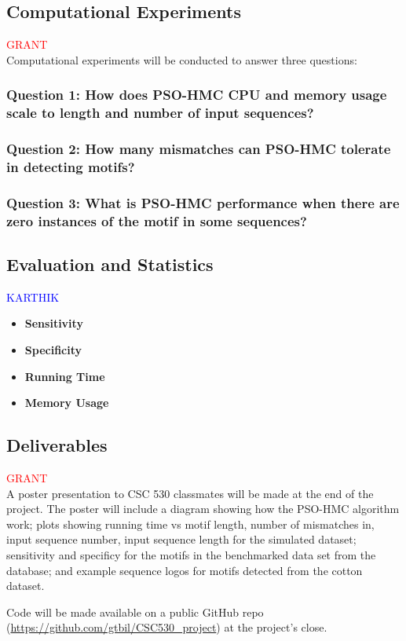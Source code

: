 \documentclass{article}
\begin{document}
\subsection{Computational Experiments}
\textcolor{red}{GRANT} \\
Computational experiments will be conducted to answer three questions:
\subsubsection{Question 1: How does PSO-HMC CPU and memory usage scale to length and number of input sequences?}
\subsubsection{Question 2: How many mismatches can PSO-HMC tolerate in detecting motifs?}
\subsubsection{Question 3: What is PSO-HMC performance when there are zero instances of the motif in some sequences?}
\subsection{Evaluation and Statistics}
\textcolor{blue}{KARTHIK} \\
\begin{itemize}
	\item \textbf{Sensitivity}
	\item \textbf{Specificity}
	\item \textbf{Running Time}
	\item \textbf{Memory Usage}
\end{itemize}
\subsection{Deliverables}
\textcolor{red}{GRANT} \\
A poster presentation to CSC 530 classmates will be made at the end of the project. The poster will include a diagram showing how the PSO-HMC algorithm work; plots showing running time vs motif length, number of mismatches in, input sequence number, input sequence length for the simulated dataset; sensitivity and specificy for the motifs in the benchmarked data set from the database; and example sequence logos for motifs detected from the cotton dataset.  
  
  Code will be made available on a public GitHub repo (\url{https://github.com/gtbil/CSC530_project}) at the project's close.  
  
\end{document}
